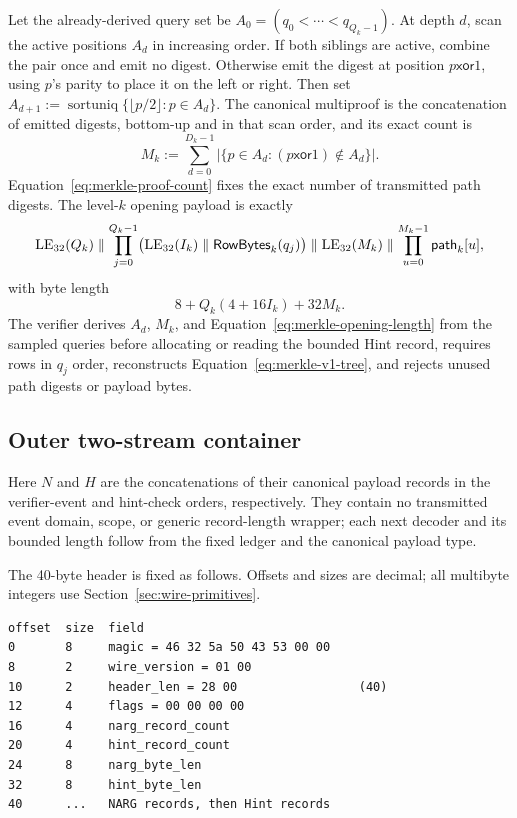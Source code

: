 Let the already-derived query set be
$A_0=(q_0<\cdots<q_{Q_k-1})$.  At depth $d$, scan the active positions $A_d$
in increasing order.  If both siblings are active, combine the pair once and
emit no digest.  Otherwise emit the digest at position
$p\mathbin{\mathsf{xor}}1$, using $p$'s parity to place it on the left or
right.  Then set
$A_{d+1}:=\operatorname{sortuniq}\{\lfloor p/2\rfloor:p\in A_d\}$.
The canonical multiproof is the concatenation of emitted digests, bottom-up
and in that scan order, and its exact count is
\begin{equation}
 M_k:=\sum_{d=0}^{D_k-1}
 \left|\{p\in A_d:(p\mathbin{\mathsf{xor}}1)\notin A_d\}\right|.
 \label{eq:merkle-proof-count}
\end{equation}
Equation~\eqref{eq:merkle-proof-count} fixes the exact number of transmitted
path digests.  The level-$k$ opening payload is exactly
\begin{equation}
 \operatorname{LE}_{32}(Q_k)\parallel
 \prod_{j=0}^{Q_k-1}
   \bigl(\operatorname{LE}_{32}(I_k)\parallel\mathsf{RowBytes}_k(q_j)\bigr)
 \parallel\operatorname{LE}_{32}(M_k)\parallel
 \prod_{u=0}^{M_k-1}\mathsf{path}_k[u],
 \label{eq:merkle-opening-payload}
\end{equation}
with byte length
\begin{equation}
 8+Q_k(4+16I_k)+32M_k.
 \label{eq:merkle-opening-length}
\end{equation}
The verifier derives $A_d$, $M_k$, and
Equation~\eqref{eq:merkle-opening-length} from the sampled queries before
allocating or reading the bounded Hint record, requires rows in $q_j$ order,
reconstructs Equation~\eqref{eq:merkle-v1-tree}, and rejects unused path
digests or payload bytes.

\subsection{Outer two-stream container}
\label{sec:wire-container}

Here $N$ and $H$ are the concatenations of their canonical payload records in
the verifier-event and hint-check orders, respectively.  They contain no
transmitted event domain, scope, or generic record-length wrapper; each next
decoder and its bounded length follow from the fixed ledger and the canonical
payload type.

The 40-byte header is fixed as follows.  Offsets and sizes are decimal; all
multibyte integers use Section~\ref{sec:wire-primitives}.

\begin{lstlisting}[style=wire]
offset  size  field
0       8     magic = 46 32 5a 50 43 53 00 00
8       2     wire_version = 01 00
10      2     header_len = 28 00                 (40)
12      4     flags = 00 00 00 00
16      4     narg_record_count
20      4     hint_record_count
24      8     narg_byte_len
32      8     hint_byte_len
40      ...   NARG records, then Hint records
\end{lstlisting}

